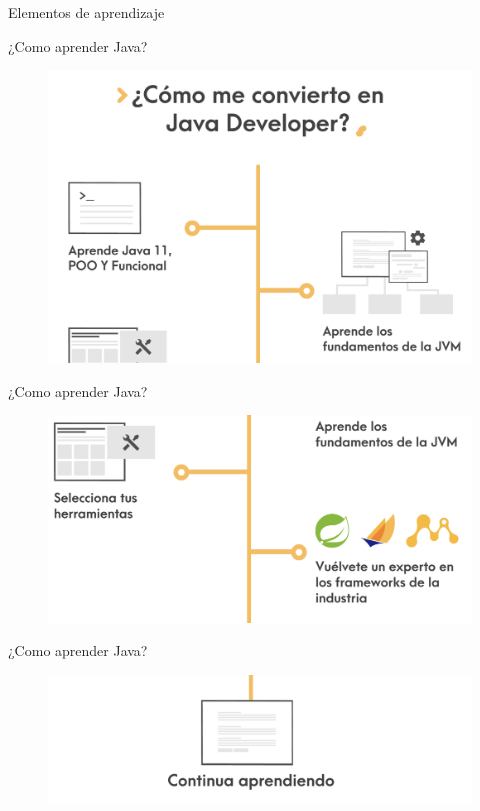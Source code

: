 \documentclass[aspectratio=169]{beamer}
\begin{document}
\begin{frame}{Elementos de aprendizaje}
\end{frame}

\begin{frame}{¿Como aprender Java?}
     \begin{figure}
            \centering
            \includegraphics[width=0.7\linewidth]{Images/camino1}
        \end{figure}
\end{frame}


\begin{frame}{¿Como aprender Java?}
     \begin{figure}
            \centering
            \includegraphics[width=0.7\linewidth]{Images/camino2}
        \end{figure}
\end{frame}

\begin{frame}{¿Como aprender Java?}
     \begin{figure}
            \centering
            \includegraphics[width=0.7\linewidth]{Images/camino3}
        \end{figure}
\end{frame}
\end{document}
